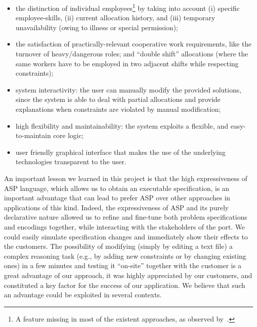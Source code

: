 \documentclass{tlp}
\begin{document}
\begin{itemize}

\item the distinction of individual employees\footnote{A feature missing in most of the existent approaches, as observed by~.}
by taking into account (i) specific employee-skills, (ii) current allocation history, and (iii)
temporary unavailability (owing to illness or special permission);

\item the satisfaction of practically-relevant cooperative work requirements, like the turnover of heavy/dangerous roles; and ``double shift'' allocations (where the same workers have to be employed in two adjacent shifts while respecting constraints);

\item system interactivity: the user can manually modify the provided solutions, since the system is able to deal with partial allocations and provide explanations when constraints are violated by manual modification;

\item high flexibility and maintainability: the system exploits a flexible, and easy-to-maintain core logic;

\item user friendly graphical interface that makes the use of the underlying technologies transparent to the user.

\end{itemize}

An important lesson we learned in this project is that the high expressiveness
of ASP language, which allows us to obtain an executable specification,
is an important advantage that can lead to prefer ASP over other approaches
in applications of this kind.
Indeed, the expressiveness of ASP and its purely declarative nature allowed us
to refine and fine-tune both problem specifications and encodings together,
while interacting with the stakeholders of the port.
We could easily simulate specification changes and immediately show their
effects to the customers.
The possibility of modifying (simply by editing a text file)
a complex reasoning task (e.g., by adding new constraints or by changing existing ones) in a few minutes
and testing
it ``on-site'' together with the customer is a great advantage of our approach,
it was highly appreciated by our customers, and constituted a key factor
for the success of our application.
We believe that such an advantage could be exploited in several contexts.
\end{document}

